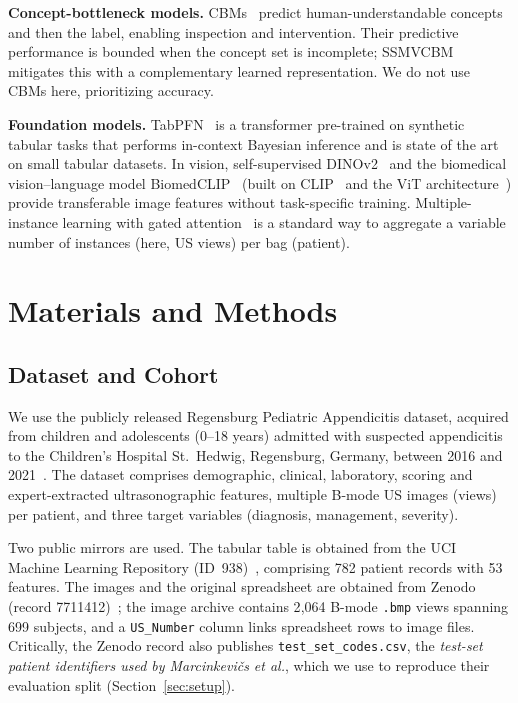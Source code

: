 \documentclass[journal]{IEEEtran}
\begin{document}
\textbf{Concept-bottleneck models.} CBMs~\cite{koh2020concept} predict
human-understandable concepts and then the label, enabling inspection and
intervention. Their predictive performance is bounded when the concept set is
incomplete; SSMVCBM~\cite{marcinkevics2024interpretable} mitigates this with a
complementary learned representation. We do not use CBMs here, prioritizing accuracy.

\textbf{Foundation models.} TabPFN~\cite{hollmann2025accurate,hollmann2023tabpfn} is a
transformer pre-trained on synthetic tabular tasks that performs in-context Bayesian
inference and is state of the art on small tabular datasets. In vision, self-supervised
DINOv2~\cite{oquab2024dinov2} and the biomedical vision--language model
BiomedCLIP~\cite{zhang2025biomedclip} (built on CLIP~\cite{radford2021learning} and the
ViT architecture~\cite{dosovitskiy2021image}) provide transferable image features
without task-specific training. Multiple-instance learning with gated
attention~\cite{ilse2018attention} is a standard way to aggregate a variable number of
instances (here, US views) per bag (patient).

\section{Materials and Methods}

\subsection{Dataset and Cohort}
We use the publicly released Regensburg Pediatric Appendicitis dataset, acquired from
children and adolescents (0--18 years) admitted with suspected appendicitis to the
Children's Hospital St.~Hedwig, Regensburg, Germany, between 2016 and
2021~\cite{marcinkevics2024interpretable}. The dataset comprises demographic, clinical,
laboratory, scoring and expert-extracted ultrasonographic features, multiple B-mode US
images (views) per patient, and three target variables (diagnosis, management,
severity).

Two public mirrors are used. The tabular table is obtained from the UCI Machine
Learning Repository (ID~938)~\cite{uci938}, comprising 782 patient records with 53
features. The images and the original spreadsheet are obtained from Zenodo (record
7711412)~\cite{zenodo7711412}; the image archive contains 2{,}064 B-mode \texttt{.bmp}
views spanning 699 subjects, and a \texttt{US\_Number} column links spreadsheet rows to
image files. Critically, the Zenodo record also publishes
\texttt{test\_set\_codes.csv}, the \emph{test-set patient identifiers used by
Marcinkevi\v{c}s et al.}, which we use to reproduce their evaluation split
(Section~\ref{sec:setup}).
\end{document}
